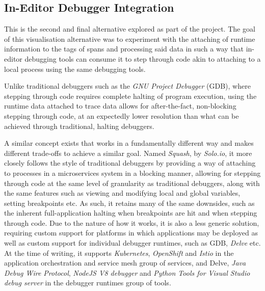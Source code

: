 \documentclass[12pt,pdftex,titlepage]{report}
\begin{document}
            \subsection{In-Editor Debugger Integration}
            \label{sec:debugger}
                This is the second and final alternative explored as part of the project. The goal of this visualisation alternative was to
                experiment with the attaching of runtime information to the tags of spans and processing said data in such a way that in-editor
                debugging tools can consume it to step through code akin to attaching to a local process using the same debugging tools.
        
                Unlike traditional debuggers such as the \textit{GNU Project Debugger}\cite{gdb} (GDB), where stepping through code requires complete
                halting of program execution, using the runtime data attached to trace data allows for after-the-fact, non-blocking stepping
                through code, at an expectedly lower resolution than what can be achieved through traditional, halting debuggers.
        
                A similar concept exists that works in a fundamentally different way and makes different trade-offs to achieve a similar goal.
                Named \textit{Squash}\cite{squash}, by \textit{Solo.io}, it more closely follows the style of traditional debuggers by providing a way of attaching
                to processes in a microservices system in a blocking manner, allowing for stepping through code at the same level of granularity as 
                traditional debuggers, along with the same features such as viewing and modifying local and global variables, setting breakpoints etc.
                As such, it retains many of the same downsides, such as the inherent full-application halting when breakpoints are hit and when stepping
                through code. Due to the nature of how it works, it is also a less generic solution, requiring custom support for platforms in which applications
                may be deployed as well as custom support for individual debugger runtimes, such as GDB, \textit{Delve}\cite{delve} etc. At the time of writing, it supports 
                \textit{Kubernetes}, \textit{OpenShift} and \textit{Istio} in the application orchestration and service mesh group of services, and Delve, \textit{Java Debug 
                Wire Protocol}\cite{jdwp}, \textit{NodeJS V8 debugger}\cite{nodejs} and \textit{Python Tools for Visual Studio debug server}\cite{ptvsd} in the debugger runtimes 
                group of tools.
\end{document}
